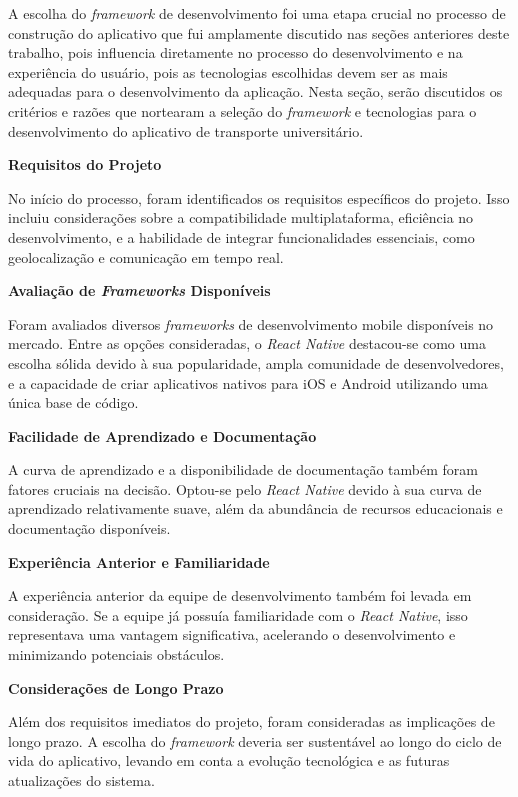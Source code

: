 \documentclass[
    12pt,                   %
    openright,              %
    oneside,                %
    a4paper,                %
    sumario=tradicional,    %
    english,                %
    brazil,                 %
    ]{abntex2}
\begin{document}
        A escolha do \textit{framework} de desenvolvimento foi uma etapa crucial no processo de construção do aplicativo que fui amplamente discutido nas seções anteriores deste trabalho, pois influencia diretamente no processo do desenvolvimento e na experiência do usuário, pois as tecnologias escolhidas devem ser as mais adequadas para o desenvolvimento da aplicação. Nesta seção, serão discutidos os critérios e razões que nortearam a seleção do \textit{framework} e tecnologias para o desenvolvimento do aplicativo de transporte universitário.
        
        \textbf{Requisitos do Projeto}
        
        No início do processo, foram identificados os requisitos específicos do projeto. Isso incluiu considerações sobre a compatibilidade multiplataforma, eficiência no desenvolvimento, e a habilidade de integrar funcionalidades essenciais, como geolocalização e comunicação em tempo real.
        
        \textbf{Avaliação de \textit{Frameworks} Disponíveis}
        
        Foram avaliados diversos \textit{frameworks} de desenvolvimento mobile disponíveis no mercado. Entre as opções consideradas, o \textit{React Native} destacou-se como uma escolha sólida devido à sua popularidade, ampla comunidade de desenvolvedores, e a capacidade de criar aplicativos nativos para iOS e Android utilizando uma única base de código.
        
        \textbf{Facilidade de Aprendizado e Documentação}
        
        A curva de aprendizado e a disponibilidade de documentação também foram fatores cruciais na decisão. Optou-se pelo \textit{React Native} devido à sua curva de aprendizado relativamente suave, além da abundância de recursos educacionais e documentação disponíveis.
        
        \textbf{Experiência Anterior e Familiaridade}
        
        A experiência anterior da equipe de desenvolvimento também foi levada em consideração. Se a equipe já possuía familiaridade com o \textit{React Native}, isso representava uma vantagem significativa, acelerando o desenvolvimento e minimizando potenciais obstáculos.
        
        \textbf{Considerações de Longo Prazo}
        
        Além dos requisitos imediatos do projeto, foram consideradas as implicações de longo prazo. A escolha do \textit{framework} deveria ser sustentável ao longo do ciclo de vida do aplicativo, levando em conta a evolução tecnológica e as futuras atualizações do sistema.
        
\end{document}
